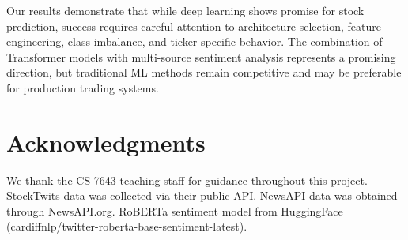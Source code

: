 \documentclass[10pt,twocolumn]{article}
\begin{document}
Our results demonstrate that while deep learning shows promise for stock prediction, success requires careful attention to architecture selection, feature engineering, class imbalance, and ticker-specific behavior. The combination of Transformer models with multi-source sentiment analysis represents a promising direction, but traditional ML methods remain competitive and may be preferable for production trading systems.

\section*{Acknowledgments}

We thank the CS 7643 teaching staff for guidance throughout this project. StockTwits data was collected via their public API. NewsAPI data was obtained through NewsAPI.org. RoBERTa sentiment model from HuggingFace (cardiffnlp/twitter-roberta-base-sentiment-latest).
\end{document}
